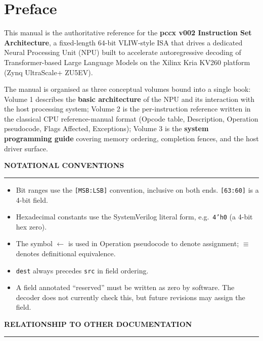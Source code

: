 \documentclass[11pt,a4paper,twoside,openany]{report}
\newcommand{\RefSection}[1]{%
  \par\medskip
  {\sffamily\bfseries\color{oceanblue}\normalsize\MakeUppercase{#1}}
  \par\vspace{-0.4em}
  {\color{oceanblue}\rule{\linewidth}{0.4pt}}\par\smallskip
}
\begin{document}

\chapter*{Preface}

This manual is the authoritative reference for the
\textbf{\color{oceanblue}pccx v002 Instruction Set Architecture}, a
fixed-length 64-bit VLIW-style ISA that drives a dedicated Neural
Processing Unit (NPU) built to accelerate autoregressive decoding of
Transformer-based Large Language Models on the Xilinx Kria KV260
platform (Zynq UltraScale+ ZU5EV).

The manual is organised as three conceptual volumes bound into a
single book: Volume 1 describes the \textbf{basic architecture} of
the NPU and its interaction with the host processing system; Volume 2
is the per-instruction reference written in the classical CPU
reference-manual format (Opcode table, Description, Operation
pseudocode, Flags Affected, Exceptions); Volume 3 is the
\textbf{system programming
guide} covering memory ordering, completion fences, and the host
driver surface.

\RefSection{Notational Conventions}

\begin{itemize}[label={\color{oceanblue}\textbullet}, leftmargin=*, itemsep=0.3ex]
  \item Bit ranges use the \texttt{[MSB:LSB]} convention, inclusive on
        both ends. \texttt{[63:60]} is a 4-bit field.
  \item Hexadecimal constants use the SystemVerilog literal form,
        e.g.\ \texttt{4'h0} (a 4-bit hex zero).
  \item The symbol $\gets$ is used in Operation pseudocode to denote
        assignment; $\equiv$ denotes definitional equivalence.
  \item \texttt{dest} always precedes \texttt{src} in field ordering.
  \item A field annotated ``reserved'' must be written as zero by
        software. The decoder does not currently check this, but future
        revisions may assign the field.
\end{itemize}

\RefSection{Relationship to Other Documentation}
\end{document}
